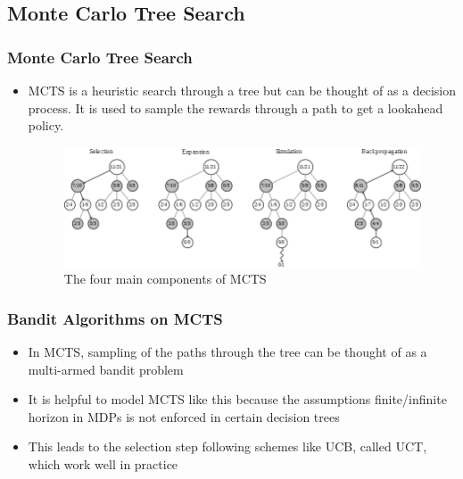 \documentclass{beamer}
\begin{document}

\subsection{Monte Carlo Tree Search}


\begin{frame}
  \frametitle{Monte Carlo Tree Search}

  \begin{itemize}
    \item MCTS is a heuristic search through a tree but can be thought of as a decision process. It is used to sample the rewards through a path to get a lookahead policy.
    \begin{figure}
      \includegraphics[width=0.6\linewidth]{./images/mcts.png}
      \caption{The four main components of MCTS}
    \end{figure}
  \end{itemize}
\end{frame}



\begin{frame}
  \frametitle{Bandit Algorithms on MCTS}

  \begin{itemize}
    \item In MCTS, sampling of the paths through the tree can be thought of as a multi-armed bandit problem
    \item It is helpful to model MCTS like this because the assumptions finite/infinite horizon in MDPs is not enforced in certain decision trees
    \item This leads to the selection step following schemes like UCB, called UCT, which work well in practice
  \end{itemize}
\end{frame}

\end{document}
